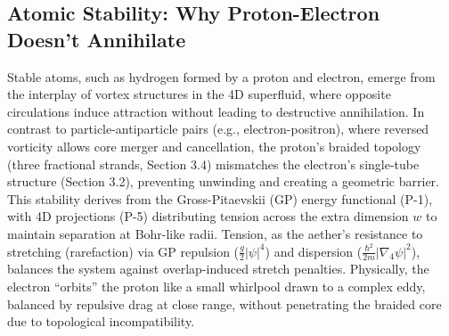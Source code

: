
\subsection{Atomic Stability: Why Proton-Electron Doesn't Annihilate}

Stable atoms, such as hydrogen formed by a proton and electron, emerge from the interplay of vortex structures in the 4D superfluid, where opposite circulations induce attraction without leading to destructive annihilation. In contrast to particle-antiparticle pairs (e.g., electron-positron), where reversed vorticity allows core merger and cancellation, the proton's braided topology (three fractional strands, Section 3.4) mismatches the electron's single-tube structure (Section 3.2), preventing unwinding and creating a geometric barrier. This stability derives from the Gross-Pitaevskii (GP) energy functional (P-1), with 4D projections (P-5) distributing tension across the extra dimension $w$ to maintain separation at Bohr-like radii. Tension, as the aether's resistance to stretching (rarefaction) via GP repulsion ($\frac{g}{2} |\psi|^4$) and dispersion ($\frac{\hbar^2}{2m} |\nabla_4 \psi|^2$), balances the system against overlap-induced stretch penalties. Physically, the electron ``orbits'' the proton like a small whirlpool drawn to a complex eddy, balanced by repulsive drag at close range, without penetrating the braided core due to topological incompatibility.


